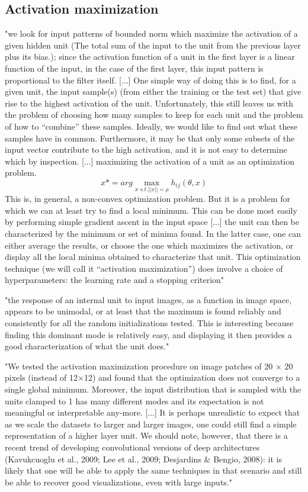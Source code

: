 \documentclass[]{scrartcl}
\begin{document}
\subsection{Activation maximization}
"we look for input patterns of bounded norm which maximize the activation of a given hidden unit (The total sum of the input to the unit from the previous layer plus its bias.); since the activation function of a unit in the first layer is a linear function of the input, in the case of the first layer, this input pattern is proportional to the filter itself. [...] 
One simple way of doing this is to find, for a given unit, the input sample(s) (from either the training or the test set) that give rise to the highest activation of the unit. Unfortunately, this still leaves us with the problem of choosing how many samples to keep for each unit and the problem of how to “combine” these samples. Ideally, we would like to find out what these samples have in common. Furthermore, it may be that only some subsets of the input vector contribute to the high activation, and it is not easy to determine which by inspection.
[...]
maximizing the activation of a unit as an optimization problem.
\begin{equation}
x* = arg \max\limits_{x \; s.t. ||x||=\rho} h_{ij}(\theta,x)
\end{equation}
This is, in general, a non-convex optimization problem. But it is a problem for which we can at least try to find a local minimum. This can be done most easily by performing simple gradient ascent in the input space [...] 
the unit can then be characterized by the minimum or set of minima found. In the latter case, one can either average the results, or choose the one which maximizes the activation, or display all the local minima obtained to characterize that unit.
This optimization technique (we will call it “activation maximization”) does involve a choice of hyperparameters: the learning rate and a stopping criterion" \cite{Erhan2009}

"the response of an internal unit to input images, as a function in image space, appears to be unimodal, or at least that the maximum is found reliably and consistently for all the random initializations tested. This is interesting because finding this dominant mode is relatively easy, and displaying it then provides a good characterization of what the unit does." \cite{Erhan2009}

"We tested the activation maximization procedure on image patches of 20 × 20 pixels (instead of 12×12) and found that the optimization does not converge to a single global minimum. Moreover, the input distribution that is sampled with the units clamped to 1 has many different modes and its expectation is not meaningful or interpretable any-more. [...] 
It is perhaps unrealistic to expect that as we scale the datasets to larger and larger images, one could still find a simple representation of a higher layer unit. We should note, however, that there is a recent trend of developing convolutional versions of deep architectures (Kavukcuoglu et al., 2009; Lee et al., 2009; Desjardins \& Bengio, 2008): it is likely that one will be able to apply the same techniques in that scenario and still be able to recover good visualizations, even with large inputs." \cite{Erhan2009}
\end{document}
